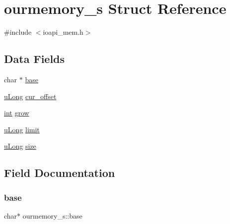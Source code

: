 \hypertarget{structourmemory__s}{}\section{ourmemory\+\_\+s Struct Reference}
\label{structourmemory__s}


{\ttfamily \#include $<$ioapi\+\_\+mem.\+h$>$}

\subsection*{Data Fields}
\begin{DoxyCompactItemize}
\item 
char $\ast$ \hyperlink{structourmemory__s_ac15465c982b4ebabffac158648965a40}{base}
\item 
\hyperlink{ioapi_8h_a50e9e9d5c30e481de822ad68fe537986}{u\+Long} \hyperlink{structourmemory__s_a3e03a5646155810e4c9c1b4c9f1a91ed}{cur\+\_\+offset}
\item 
\hyperlink{lp__lib_8h_adeb9ec6400320e4923ac9d836d509ddb}{int} \hyperlink{structourmemory__s_a566f3fb196847bc1eb1f739e6e89464f}{grow}
\item 
\hyperlink{ioapi_8h_a50e9e9d5c30e481de822ad68fe537986}{u\+Long} \hyperlink{structourmemory__s_a68febfbd7931c5a97d38794f60317c09}{limit}
\item 
\hyperlink{ioapi_8h_a50e9e9d5c30e481de822ad68fe537986}{u\+Long} \hyperlink{structourmemory__s_acbf51ab909811f599a1d53c6104f0210}{size}
\end{DoxyCompactItemize}


\subsection{Field Documentation}
\mbox{\label{structourmemory__s_ac15465c982b4ebabffac158648965a40}} 
\subsubsection{\texorpdfstring{base}{base}}
{\footnotesize\ttfamily char$\ast$ ourmemory\+\_\+s\+::base}

\mbox{\label{structourmemory__s_a3e03a5646155810e4c9c1b4c9f1a91ed}} 
